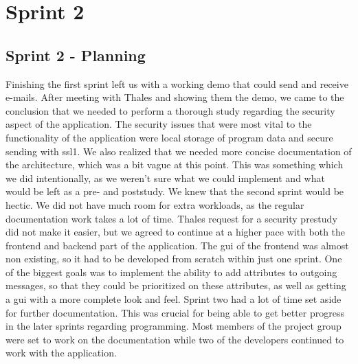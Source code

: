 \chapter{Sprint 2}

\section{Sprint 2 - Planning}
Finishing the first sprint left us with a working demo that could send and receive e-mails. After meeting with Thales and showing them the demo, we came to the conclusion that we needed to perform a thorough study regarding the security aspect of the application. The security issues that were most vital to the functionality of the application were local storage of program data and secure sending with \gls{ssl1}. We also realized that we needed more concise documentation of the architecture, which was a bit vague at this point. This was something which we did intentionally, as we weren’t sure what we could implement and what would be left as a pre- and poststudy. 
\newline
\newline
We knew that the second sprint would be hectic. We did not have much room for extra workloads, as the regular documentation work takes a lot of time. Thales request for a security prestudy did not make it easier, but we agreed to continue at a higher pace with both the frontend and backend part of the application. The \gls{gui} of the frontend was almost non existing, so it had to be developed from scratch within just one sprint. One of the biggest goals was to implement the ability to add attributes to outgoing messages, so that they could be prioritized on these attributes, as well as getting a \gls{gui} with a more complete look and feel.
\newline
\newline
Sprint two had a lot of time set aside for further documentation. This was crucial for being able to get better progress in the later sprints regarding programming. Most members of the project group were set to work on the documentation while two of the developers continued to work with the application. 